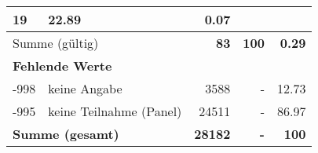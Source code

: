 \begin{longtable}{lXrrr}
       \num{19} &
       \num[round-mode=places,round-precision=2]{22.89} &
         \num[round-mode=places,round-precision=2]{0.07} \\
     \midrule
     \multicolumn{2}{l}{Summe (gültig)} &
       \textbf{\num{83}} &
     \textbf{\num{100}} &
       \textbf{\num[round-mode=places,round-precision=2]{0.29}} \\
     \multicolumn{5}{l}{\textbf{Fehlende Werte}}\\
       -998 &
       keine Angabe &
         \num{3588} &
        - &
         \num[round-mode=places,round-precision=2]{12.73} \\
       -995 &
       keine Teilnahme (Panel) &
         \num{24511} &
        - &
         \num[round-mode=places,round-precision=2]{86.97} \\
     \midrule
     \multicolumn{2}{l}{\textbf{Summe (gesamt)}} &
          \textbf{\num{28182}} &
        \textbf{-} &
        \textbf{\num{100}} \\
     \bottomrule
     \end{longtable}
     
